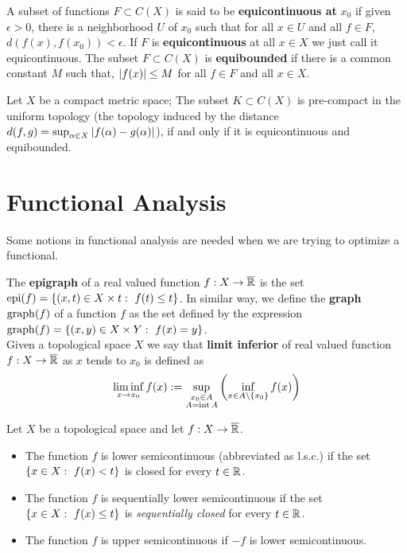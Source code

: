 A subset of functions $F\subset C(X)$ is said to be \textbf{equicontinuous at} $x_0$ if given $\epsilon>0$, there is a neighborhood $U$ of $x_0$ such that for all $x\in U$ and all $f\in F$, $d(f(x), f(x_0))<\epsilon$. If $F$ is \textbf{equicontinuous} at all $x\in X$ we just call it equicontinuous. The subset $F\subset C(X)$ is \textbf{equibounded} if there is a common constant $M$ such that, $\left| f(x) \right|\leq M$ for all $f\in F$ and all $x\in X$.
\begin{theorem}
	Let $X$ be a compact metric space;  The subset $K\subset C(X)$ is pre-compact in the uniform topology (the topology induced by the distance $d(f,g)=\sup_{\alpha\in X} \left| f(\alpha)-g(\alpha) \right|$), if and only if it is equicontinuous and equibounded.
\end{theorem}

\section{Functional Analysis}
Some notions in functional analysis are needed when we are trying to optimize a functional. 


The \textbf{epigraph} of a real valued function $f:X\rightarrow \overline{\mathbb{R}}$ is the set $\mathrm{epi}(f)=\left\lbrace (x,t)\in X\times t:\ f(t)\leq t \right\rbrace$. In similar way, we define the \textbf{graph} $\mathrm{graph}(f)$ of a function $f$ as the set defined by the expression $\graph(f)=\braces{(x,y)\in X\times Y:\ f(x)=y}$. \\
Given a topological space $X$ we say that \textbf{limit inferior} of real valued function $f:X\rightarrow \overline{\mathbb{R}}$ as $x$ tends to $x_0$ is defined as
\begin{equation*}
	\liminf_{x\rightarrow x_0} f(x):=\sup_{\substack{x_0\in A\\A=\mathrm{int}\, A}} \left( \inf_{x\in A\backslash \left\lbrace x_0 \right\rbrace} f(x) \right)
\end{equation*}
\begin{definition}
	\label{def: l.s.c.}
	Let $X$ be a topological space and let $f:X\rightarrow \overline{\mathbb{R}}$.
	\begin{itemize}
		\item The function $f$ is lower semicontinuous (abbreviated as l.s.c.) if the set $\left\lbrace x\in X:\ f(x)<t \right\rbrace$ is closed for every $t\in \mathbb{R}$.
		\item The function $f$ is sequentially lower semicontinuous if the set $\left\lbrace x \in X:\ f(x)\leq t \right\rbrace$ is \emph{sequentially closed} for every $t\in \mathbb{R}$.
		\item The function $f$ is upper semicontinuous if $-f$ is lower semicontinuous.   
	\end{itemize}
\end{definition}	 


